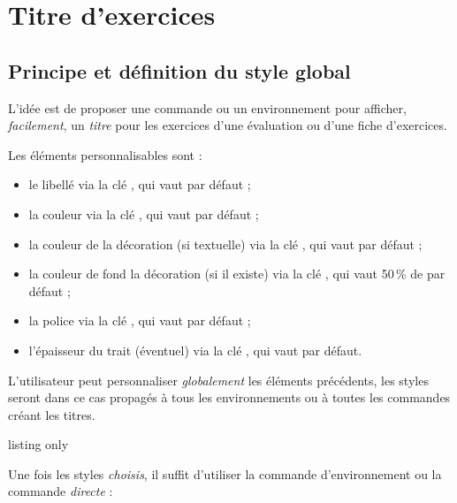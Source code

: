 \documentclass[french,11pt,a4paper]{article}
\begin{document}
\pagebreak

\section{Titre d'exercices}

\subsection{Principe et définition du style global}

L'idée est de proposer une commande ou un environnement pour afficher, \textit{facilement}, un \textit{titre} pour les exercices d'une évaluation ou d'une fiche d'exercices.

\smallskip

Les éléments personnalisables sont :

\begin{itemize}
	\item le libellé via la clé \MontreCode{[Libelle]}, qui vaut  par défaut ;
	\item la couleur via la clé \MontreCode{[Couleur]}, qui vaut  par défaut ;
	\item la couleur de la décoration (si textuelle) via la clé \MontreCode{[CouleurDeco]}, qui vaut  par défaut ;
	\item la couleur de fond la décoration (si il existe) via la clé \MontreCode{[CouleurFondDeco]}, qui vaut 50\,\% de  par défaut ;
	\item la police via la clé \MontreCode{[Police]}, qui vaut  par défaut ;
	\item l'épaisseur du trait (éventuel) via la clé \MontreCode{[EpTrait]}, qui vaut \MontreCode{1.1pt} par défaut.
\end{itemize}

L'utilisateur peut personnaliser \textit{globalement} les éléments précédents, les styles seront dans ce cas propagés à tous les environnements ou à toutes les commandes créant les titres.

\begin{DemoCode}{listing only}
\StyleEnvtExo[clés]

\StyleEnvtExoDefaut
\end{DemoCode}

Une fois les styles \textit{choisis}, il suffit d'utiliser la commande d'environnement ou la commande \textit{directe} :
\end{document}
